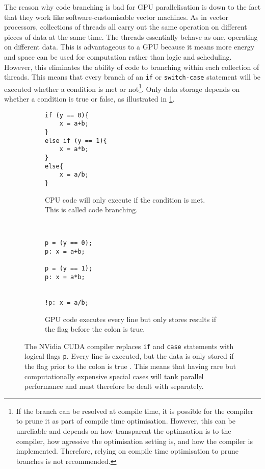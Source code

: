The reason why code branching is bad for GPU parallelisation is down to the fact that they work like software-customisable vector machines. As in vector processors, collections of threads all carry out the same operation on different pieces of data at the same time. The threads essentially behave as one, operating on different data. This is advantageous to a GPU because it means more energy and space can be used for computation rather than logic and scheduling. However, this eliminates the ability of code to branching within each collection of threads. This means that every branch of an \texttt{if} or \texttt{switch-case} statement will be executed whether a condition is met or not\footnote{If the branch can be resolved at compile time, it is possible for the compiler to prune it as part of compile time optimisation. However, this can be unreliable and depends on how transparent the optimsation is to the compiler, how agressive the optimisation setting is, and how the compiler is implemented. Therefore, relying on compile time optimisation to prune branches is not recommended.}. Only data storage depends on whether a condition is true or false, as illustrated in \cref{f:code_branching}.
\begin{figure}
    \centering
    \begin{subfigure}[t]{0.48\textwidth}
        \centering
        \begin{verbatim}
if (y == 0){
    x = a+b;
}
else if (y == 1){
    x = a*b;
}
else{
    x = a/b;
}
			\end{verbatim}
        \caption{CPU code will only execute if the condition is met. This is called code branching.}
    \end{subfigure}
    ~
    \begin{subfigure}[t]{0.48\textwidth}
        \centering
        \begin{verbatim}
p = (y == 0);
p: x = a+b;

p = (y == 1);
p: x = a*b;


!p: x = a/b;
			\end{verbatim}
        \vspace{12pt}
        \caption{GPU code executes every line but only stores results if the flag before the colon is true.}
    \end{subfigure}
    \caption[Explanation of warp divergence.]{The NVidia CUDA compiler replaces \texttt{if} and \texttt{case} statements with logical flags \texttt{p}. Every line is executed, but the data is only stored if the flag prior to the colon is true \cite{nvidia}. This means that having rare but computationally expensive special cases will tank parallel performance and must therefore be dealt with separately.}
    \label{f:code_branching}
\end{figure}


